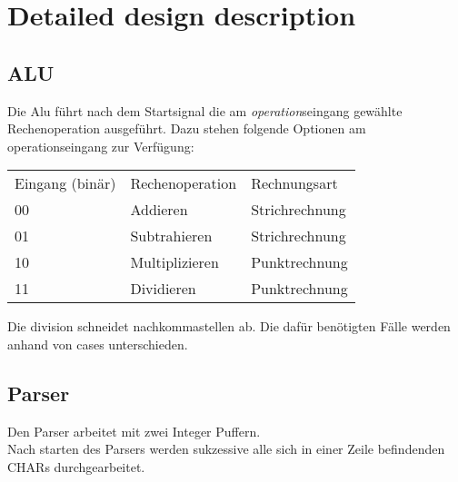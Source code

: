 \section{Detailed design description}


\subsection{ALU}
Die Alu führt nach dem Startsignal die am \textit{operation}seingang gewählte 
Rechenoperation ausgeführt. Dazu stehen folgende Optionen am operationseingang zur Verfügung:
\begin{center}
\begin{tabular}[!ht]{|l|l|l|}
\hline Eingang (binär) & Rechenoperation & Rechnungsart\\ 
	00 & Addieren & Strichrechnung\\ 
	01 & Subtrahieren & Strichrechnung\\ 
	10 & Multiplizieren & Punktrechnung\\ 
	11 & Dividieren & Punktrechnung\\
 \hline
\end{tabular}
\end{center}
Die division schneidet nachkommastellen ab.
Die dafür benötigten Fälle werden anhand von cases unterschieden.
\subsection{Parser}
Den Parser arbeitet mit zwei Integer Puffern. \\
Nach starten des Parsers werden sukzessive alle sich in einer Zeile befindenden CHARs durchgearbeitet.

